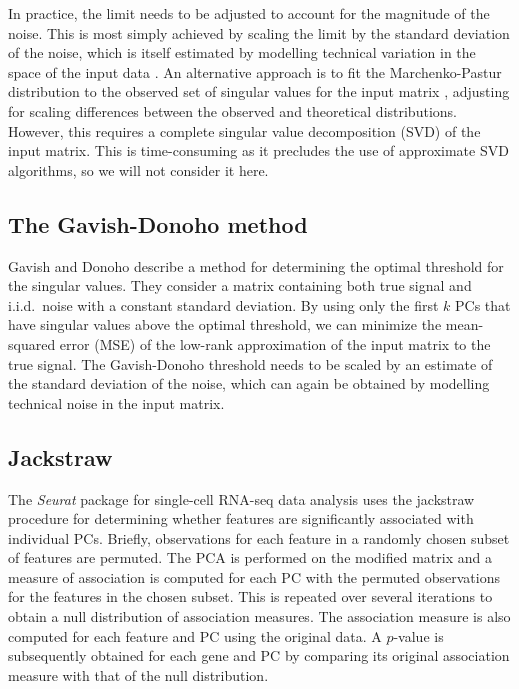 \documentclass[10pt,letterpaper]{article}
\begin{document}
In practice, the limit needs to be adjusted to account for the magnitude of the noise.
This is most simply achieved by scaling the limit by the standard deviation of the noise, 
which is itself estimated by modelling technical variation in the space of the input data \cite{lun2016stepbystep}.
An alternative approach is to fit the Marchenko-Pastur distribution to the observed set of singular values for the input matrix \cite{shekhar2016comprehensive},
adjusting for scaling differences between the observed and theoretical distributions.
However, this requires a complete singular value decomposition (SVD) of the input matrix.
This is time-consuming as it precludes the use of approximate SVD algorithms, so we will not consider it here.

\subsection{The Gavish-Donoho method}
Gavish and Donoho \cite{gavish2014optimal} describe a method for determining the optimal threshold for the singular values.
They consider a matrix containing both true signal and i.i.d.\ noise with a constant standard deviation. 
By using only the first $k$ PCs that have singular values above the optimal threshold, 
we can minimize the mean-squared error (MSE) of the low-rank approximation of the input matrix to the true signal.
The Gavish-Donoho threshold needs to be scaled by an estimate of the standard deviation of the noise,
which can again be obtained by modelling technical noise in the input matrix.

\subsection{Jackstraw}
The \textit{Seurat} package for single-cell RNA-seq data analysis \cite{butler2018integrating} uses the jackstraw procedure \cite{chung2015statistical} for determining whether features are significantly associated with individual PCs.
Briefly, observations for each feature in a randomly chosen subset of features are permuted.
The PCA is performed on the modified matrix and a measure of association is computed for each PC with the permuted observations for the features in the chosen subset.
This is repeated over several iterations to obtain a null distribution of association measures.
The association measure is also computed for each feature and PC using the original data.
A $p$-value is subsequently obtained for each gene and PC by comparing its original association measure with that of the null distribution.
\end{document}

